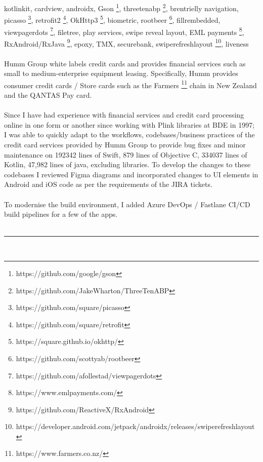 \documentclass{article}
\let\svthefootnote\thefootnote
\newcommand\Cfootnote[2][black]{\def\thefootnote{\color{#1}\svthefootnote}%
  \footnote{\color{#1}#2}}
\begin{document}
kotlinkit, cardview, androidx, Gson\Cfootnote[blue]{\label{gson} https://github.com/google/gson}, threetenabp\Cfootnote[blue]{https://github.com/JakeWharton/ThreeTenABP}, brentrielly navigation, picasso\Cfootnote[blue]{https://github.com/square/picasso}, retrofit2\Cfootnote[blue]{\label{retrofit}https://github.com/square/retrofit}, OkHttp3\Cfootnote[blue]{\label{okhttp}https://square.github.io/okhttp/}, biometric, rootbeer\Cfootnote[blue]{https://github.com/scottyab/rootbeer}, fillrembedded, viewpagerdots\Cfootnote[blue]{https://github.com/afollestad/viewpagerdots}, filetree, play services, swipe reveal layout, EML payments\Cfootnote[blue]{https://www.emlpayments.com/}, RxAndroid/RxJava\Cfootnote[blue]{\label{rxjava}https://github.com/ReactiveX/RxAndroid}, epoxy,  TMX, securebank, swiperefreshlayout\Cfootnote[blue]{https://developer.android.com/jetpack/androidx/releases/swiperefreshlayout}, liveness   \\
\\
Humm Group white labels credit cards and provides financial services such as small to medium-enterprise equipment leasing. 
Specifically, Humm provides consumer credit cards / Store cards such as the Farmers\Cfootnote[blue]{https://www.farmers.co.nz/} chain in New Zealand and the QANTAS Pay card.\\
\\
Since I have had experience with financial services and credit card processing online in one form or another since working with Plink libraries at BDE in 1997; I was able to quickly adapt to the workflows, codebases/business practices of the credit card services provided by Humm Group to provide bug fixes and minor maintenance on 192342 lines of Swift, 879 lines of Objective C, 334037 lines of Kotlin, 47,982 lines of java, excluding libraries. To develop the changes to these codebases I reviewed Figma diagrams and incorporated changes to UI elements in Android and iOS code as per the requirements of the JIRA tickets. \\
\\
To modernise the build environment, I added Azure DevOps / Fastlane CI/CD build pipelines for a few of the apps. \\ 	
\\


\noindent\hfil\rule{0.5\textwidth}{.4pt}\hfil
\\
\end{document}
